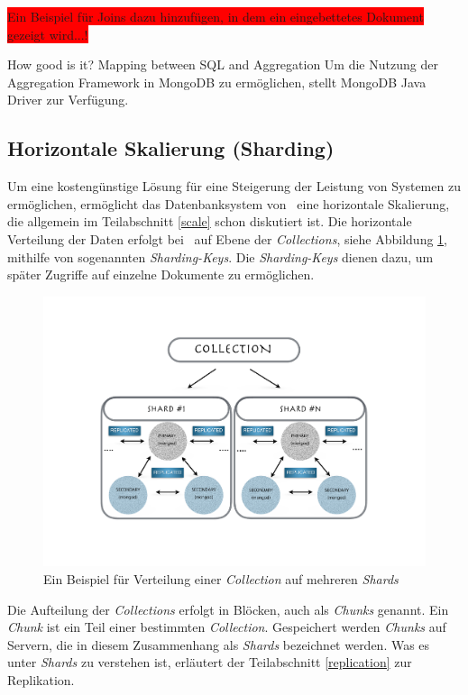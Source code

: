 \colorbox{red}{Ein Beispiel für Joins dazu hinzufügen, in dem ein eingebettetes Dokument gezeigt wird...!}

How good is it? Mapping between SQL and Aggregation
Um die Nutzung der Aggregation Framework in MongoDB zu ermöglichen, stellt MongoDB Java Driver zur Verfügung.  

\subsection{Horizontale Skalierung (Sharding)}
Um eine kostengünstige Lösung für eine Steigerung der Leistung von Systemen zu ermöglichen, ermöglicht das Datenbanksystem von \mongo\  eine horizontale Skalierung, die allgemein im Teilabschnitt \ref{scale} schon diskutiert ist. Die horizontale Verteilung der Daten erfolgt bei \mongo\ auf Ebene der \textit{Collections}, siehe Abbildung \ref{img:sharding}, mithilfe von sogenannten \textit{Sharding-Keys}. Die \textit{Sharding-Keys} dienen dazu, um später Zugriffe auf einzelne Dokumente zu ermöglichen.
\begin{figure}[H]
\centering
\includegraphics[trim = 0mm 35mm 0mm 30mm, clip, width=1.0\textwidth]{resources/replicaSet/sharding}
\caption[Ein Beispiel für Verteilung einer \textit{Collection} auf mehreren \textit{Shards}]{Ein Beispiel für Verteilung einer \textit{Collection} auf mehreren \textit{Shards}}
\label{img:sharding}
\end{figure}
Die Aufteilung der \textit{Collections} erfolgt in Blöcken, auch als \textit{Chunks} genannt. Ein \textit{Chunk} ist ein Teil einer bestimmten \textit{Collection}. Gespeichert werden \textit{Chunks} auf Servern, die in diesem Zusammenhang als \textit{Shards} bezeichnet werden. Was es unter \textit{Shards} zu verstehen ist, erläutert der Teilabschnitt \ref{replication} zur Replikation.

